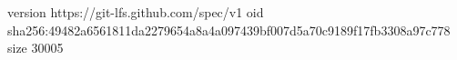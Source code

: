 version https://git-lfs.github.com/spec/v1
oid sha256:49482a6561811da2279654a8a4a097439bf007d5a70c9189f17fb3308a97c778
size 30005
